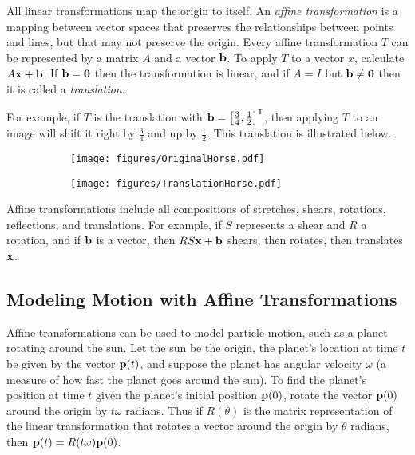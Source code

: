 All linear transformations map the origin to itself.
An \emph{affine transformation} is a mapping between vector spaces that preserves the relationships between points and lines, but that may not preserve the origin.
Every affine transformation $T$ can be represented by a matrix $A$ and a vector $\mathbf{b}$.
To apply $T$ to a vector $x$, calculate $A\mathbf{x} + \mathbf{b}$.
If $\mathbf{b} = \mathbf{0}$ then the transformation is linear, and if $A = I$ but $\mathbf{b}\neq\mathbf{0}$ then it is called a \emph{translation}.

For example, if $T$ is the translation with $\mathbf{b} = \left[\frac{3}{4}, \frac{1}{2}\right]^{\mathsf T}$, then applying $T$ to an image will shift it right by $\frac{3}{4}$ and up by $\frac{1}{2}$.
This translation is illustrated below.

\begin{figure}[H] %
\captionsetup[subfigure]{justification=centering}
\centering
\begin{subfigure}{.32\textwidth}
    \centering
    \texttt{[image: figures/OriginalHorse.pdf]}
\end{subfigure}%
\begin{subfigure}{.32\textwidth}
    \centering
    \texttt{[image: figures/TranslationHorse.pdf]}
\end{subfigure}
\end{figure}

Affine transformations include all compositions of stretches, shears, rotations, reflections, and translations.
For example, if $S$ represents a shear and $R$ a rotation, and if $\mathbf{b}$ is a vector, then $RS\mathbf{x} + \mathbf{b}$ shears, then rotates, then translates $\mathbf{x}$.

\subsection*{Modeling Motion with Affine Transformations} %

Affine transformations can be used to model particle motion, such as a planet rotating around the sun.
Let the sun be the origin, the planet's location at time $t$ be given by the vector $\mathbf{p}(t)$, and suppose the planet has angular velocity $\omega$ (a measure of how fast the planet goes around the sun).
To find the planet's position at time $t$ given the planet's initial position $\mathbf{p}(0)$, rotate the vector $\mathbf{p}(0)$ around the origin by $t\omega$ radians.
Thus if $R(\theta)$ is the matrix representation of the linear transformation that rotates a vector around the origin by $\theta$ radians, then $\mathbf{p}(t) = R(t\omega)\mathbf{p}(0)$.

